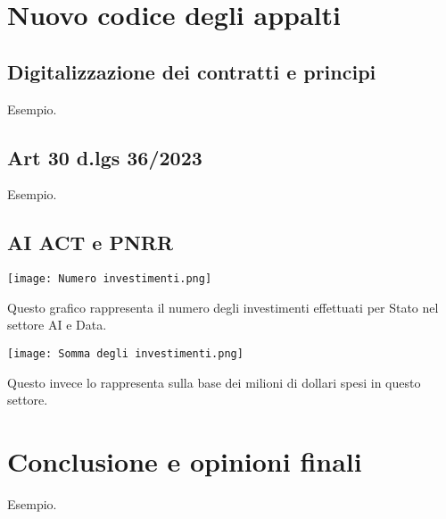 \documentclass{article}
\begin{document}
\newpage\centering
\section{Nuovo codice degli appalti}
\begin{justify}
    
\end{justify}

\subsection{Digitalizzazione dei contratti e principi}
\begin{justify}
    Esempio.
\end{justify}

\subsection{Art 30 d.lgs 36/2023}
\begin{justify}
    Esempio.
\end{justify}


\subsection{AI ACT e PNRR}
\begin{center}
    \texttt{[image: Numero investimenti.png]}
\end{center}
\begin{justify}
    Questo grafico rappresenta il numero degli investimenti effettuati per Stato nel settore AI e Data.
\end{justify}

\begin{center}
    \texttt{[image: Somma degli investimenti.png]}
\end{center}
\begin{justify}
    Questo invece lo rappresenta sulla base dei milioni di dollari spesi in questo settore.
\end{justify}

\newpage \centering
\section{Conclusione e opinioni finali}
\begin{justify}
    Esempio.
\end{justify}

\begin{justify}
    
    
\end{justify}
\end{document}

